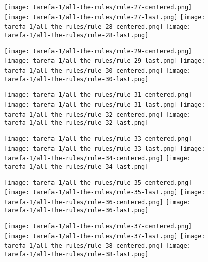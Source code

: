 \begin{figure}[htbp]
  \centering
\texttt{[image: tarefa-1/all-the-rules/rule-27-centered.png]}
\texttt{[image: tarefa-1/all-the-rules/rule-27-last.png]}
\texttt{[image: tarefa-1/all-the-rules/rule-28-centered.png]}
\texttt{[image: tarefa-1/all-the-rules/rule-28-last.png]}
\end{figure}
\begin{figure}[htbp]
  \centering
\texttt{[image: tarefa-1/all-the-rules/rule-29-centered.png]}
\texttt{[image: tarefa-1/all-the-rules/rule-29-last.png]}
\texttt{[image: tarefa-1/all-the-rules/rule-30-centered.png]}
\texttt{[image: tarefa-1/all-the-rules/rule-30-last.png]}
\end{figure}
\begin{figure}[htbp]
  \centering
\texttt{[image: tarefa-1/all-the-rules/rule-31-centered.png]}
\texttt{[image: tarefa-1/all-the-rules/rule-31-last.png]}
\texttt{[image: tarefa-1/all-the-rules/rule-32-centered.png]}
\texttt{[image: tarefa-1/all-the-rules/rule-32-last.png]}
\end{figure}
\begin{figure}[htbp]
  \centering
\texttt{[image: tarefa-1/all-the-rules/rule-33-centered.png]}
\texttt{[image: tarefa-1/all-the-rules/rule-33-last.png]}
\texttt{[image: tarefa-1/all-the-rules/rule-34-centered.png]}
\texttt{[image: tarefa-1/all-the-rules/rule-34-last.png]}
\end{figure}
\begin{figure}[htbp]
  \centering
\texttt{[image: tarefa-1/all-the-rules/rule-35-centered.png]}
\texttt{[image: tarefa-1/all-the-rules/rule-35-last.png]}
\texttt{[image: tarefa-1/all-the-rules/rule-36-centered.png]}
\texttt{[image: tarefa-1/all-the-rules/rule-36-last.png]}
\end{figure}
\begin{figure}[htbp]
  \centering
\texttt{[image: tarefa-1/all-the-rules/rule-37-centered.png]}
\texttt{[image: tarefa-1/all-the-rules/rule-37-last.png]}
\texttt{[image: tarefa-1/all-the-rules/rule-38-centered.png]}
\texttt{[image: tarefa-1/all-the-rules/rule-38-last.png]}
\end{figure}
